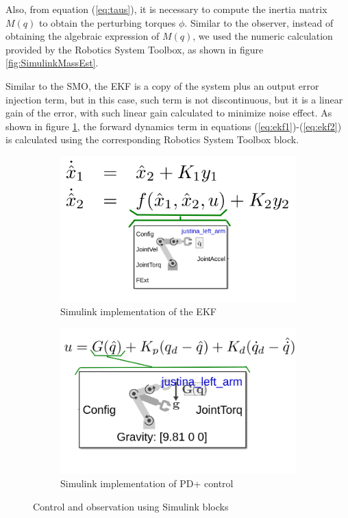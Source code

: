\documentclass[a4paper, 10pt]{article}
\begin{document}
Also, from equation (\ref{eq:taus}), it is necessary to compute the inertia matrix $M(q)$ to obtain the perturbing torques $\phi$. Similar to the observer, instead of obtaining the algebraic expression of $M(q)$, we used the numeric calculation provided by the Robotics System Toolbox, as shown in figure \ref{fig:SimulinkMassEst}.

  Similar to the SMO, the EKF is a copy of the system plus an output error injection term, but in this case, such term is not discontinuous, but it is a linear gain of the error, with such linear gain calculated to minimize noise effect. As shown in figure \ref{fig:EKFSimulink}, the forward dynamics term in equations (\ref{eq:ekf1})-(\ref{eq:ekf2}) is calculated using the corresponding Robotics System Toolbox block. 

\begin{figure}[!h]
  \centering    
  \begin{subfigure}{0.35\textwidth}
  \centering
  \includegraphics[width=\textwidth]{Figures/EKFSimulink.png}
  \caption{Simulink implementation of the EKF}
  \label{fig:EKFSimulink}
  \end{subfigure}
  \begin{subfigure}{0.35\textwidth}
  \centering
  \includegraphics[width=\textwidth]{Figures/ControlSimulink.png}
  \caption{Simulink implementation of PD+ control}
  \label{fig:ControlSimulink}
  \end{subfigure}
  \caption{Control and observation using Simulink blocks}
\end{figure}
\end{document}
